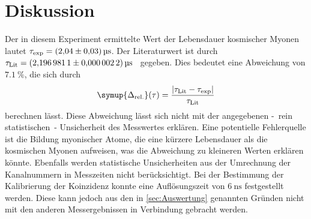 \section{Diskussion}
\label{sec:Diskussion}
Der in diesem Experiment ermittelte Wert der Lebensdauer kosmischer Myonen lautet $\tau_\text{exp} = \qty{2.04 +- 0.03}{\micro\second}$. Der Literaturwert ist 
durch $\tau_\text{Lit} = \qty{2.1969811+-0.0000022}{\micro\second}$~\cite{PDG:muon} gegeben. Dies bedeutet eine Abweichung von $\qty{7.1}{\percent}$, die sich durch 
\begin{equation}
\symup{\Delta_\text{rel.}}(\tau) = \frac{|\tau_\text{Lit} - \tau_\text{exp}|}{\tau_\text{Lit}}
\end{equation}
berechnen lässt. Diese Abweichung lässt sich nicht mit der angegebenen -~rein statistischen~- Unsicherheit des Messwertes erklären. Eine potentielle Fehlerquelle
ist die Bildung myonischer Atome, die eine kürzere Lebensdauer als die kosmischen Myonen aufweisen, was die Abweichung zu kleineren Werten erklären könnte.
Ebenfalls werden statistische Unsicherheiten aus der Umrechnung der Kanalnummern in Messzeiten nicht berücksichtigt. 
Bei der Bestimmung der Kalibrierung der 
Koinzidenz konnte eine Auflösungszeit von $\qty{6}{\nano\second}$ festgestellt werden. Diese kann jedoch aus den in \autoref{sec:Auswertung} genannten Gründen
nicht mit den anderen Messergebnissen in Verbindung gebracht werden.
